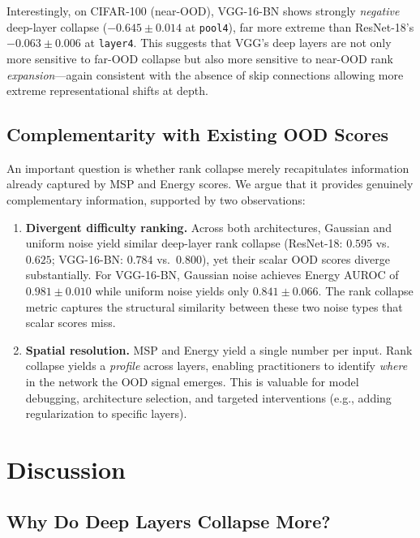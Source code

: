 \documentclass{article}
\begin{document}
Interestingly, on CIFAR-100 (near-OOD), VGG-16-BN shows strongly \emph{negative} deep-layer collapse ($-0.645 \pm 0.014$ at \texttt{pool4}), far more extreme than ResNet-18's $-0.063 \pm 0.006$ at \texttt{layer4}. This suggests that VGG's deep layers are not only more sensitive to far-OOD collapse but also more sensitive to near-OOD rank \emph{expansion}---again consistent with the absence of skip connections allowing more extreme representational shifts at depth.

\subsection{Complementarity with Existing OOD Scores}
\label{sec:complementarity}

An important question is whether rank collapse merely recapitulates information already captured by MSP and Energy scores. We argue that it provides genuinely complementary information, supported by two observations:

\begin{enumerate}
    \item \textbf{Divergent difficulty ranking.} Across both architectures, Gaussian and uniform noise yield similar deep-layer rank collapse (ResNet-18: $0.595$ vs.\ $0.625$; VGG-16-BN: $0.784$ vs.\ $0.800$), yet their scalar OOD scores diverge substantially. For VGG-16-BN, Gaussian noise achieves Energy AUROC of $0.981 \pm 0.010$ while uniform noise yields only $0.841 \pm 0.066$. The rank collapse metric captures the structural similarity between these two noise types that scalar scores miss.
    \item \textbf{Spatial resolution.} MSP and Energy yield a single number per input. Rank collapse yields a \emph{profile} across layers, enabling practitioners to identify \emph{where} in the network the OOD signal emerges. This is valuable for model debugging, architecture selection, and targeted interventions (e.g., adding regularization to specific layers).
\end{enumerate}

\section{Discussion}
\label{sec:discussion}

\subsection{Why Do Deep Layers Collapse More?}
\end{document}

